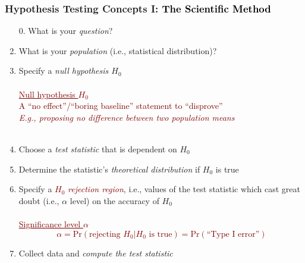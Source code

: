 \documentclass[xcolor={dvipsnames}]{beamer}
\begin{document}
\frame
{
 \frametitle{Hypothesis Testing Concepts I: \textcolor{black}{\textbf{The Scientific Method}}}


\begin{enumerate}
\item[0.] What is your \emph{question}?
\item<2-> What is your \emph{population} \textcolor{NavyBlue}{(i.e., statistical distribution)}?
\item<3-> Specify a \emph{null hypothesis $H_0$}\\
${}$\\
\textcolor{Maroon}{\underline{Null hypothesis $H_0$}\\
A  ``no effect''/``boring baseline'' statement to ``disprove''\\
\emph{E.g., proposing no difference between two population means}\\${}$\\}

\item<4-> Choose a \emph{test statistic} \textcolor{NavyBlue}{that is dependent on $H_0$}

\item<5-> Determine the statistic's \emph{theoretical distribution} \textcolor{NavyBlue}{if $H_0$ is true}

\item<6-> Specify a \textcolor{Maroon}{$H_0$ \emph{rejection region}}, i.e., values of the test statistic 
which cast great doubt \textcolor{NavyBlue}{(i.e.,  $\alpha$ level)} on the accuracy of $H_0$\\
${}$\\

\textcolor{Maroon}{
\underline{Significance level $\alpha$}
$$\alpha = \text{Pr}(\text{rejecting $H_0$} | H_0 \text{ is true}) = \text{Pr}(\text{``Type I error''})$$
}
\vspace{-.5em}
\item<7-> Collect data and \emph{compute the test statistic}

\end{enumerate}

}
\end{document}
